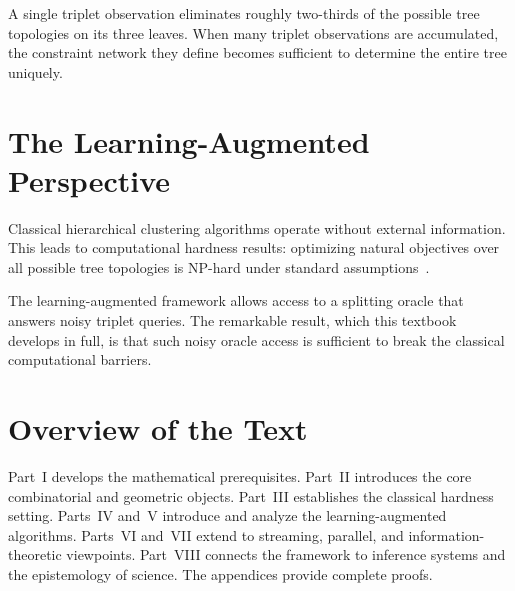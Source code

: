 A single triplet observation eliminates roughly two-thirds of the possible tree topologies on its three leaves. When many triplet observations are accumulated, the constraint network they define becomes sufficient to determine the entire tree uniquely.

\section{The Learning-Augmented Perspective}

Classical hierarchical clustering algorithms operate without external information. This leads to computational hardness results: optimizing natural objectives over all possible tree topologies is NP-hard under standard assumptions~\cite{Charikar2019,CohenAddad2019}.

The learning-augmented framework allows access to a splitting oracle that answers noisy triplet queries. The remarkable result, which this textbook develops in full, is that such noisy oracle access is sufficient to break the classical computational barriers.

\section{Overview of the Text}

Part~I develops the mathematical prerequisites. Part~II introduces the core combinatorial and geometric objects. Part~III establishes the classical hardness setting. Parts~IV and~V introduce and analyze the learning-augmented algorithms. Parts~VI and~VII extend to streaming, parallel, and information-theoretic viewpoints. Part~VIII connects the framework to inference systems and the epistemology of science. The appendices provide complete proofs.
